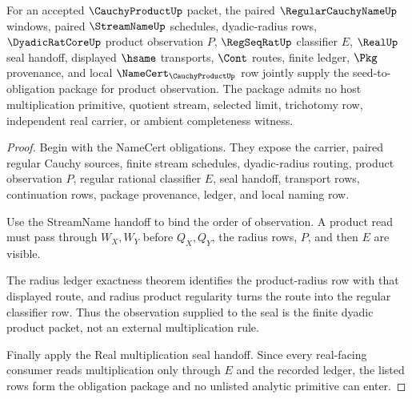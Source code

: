 \begin{theorem}
\label{thm:cauchy-product-product-observation-seal-obligations}
For an accepted $\CauchyProductUp$ packet, the paired $\RegularCauchyNameUp$ windows, paired $\StreamNameUp$ schedules, dyadic-radius rows, $\DyadicRatCoreUp$ product observation $P$, $\RegSeqRatUp$ classifier $E$, $\RealUp$ seal handoff, displayed $\hsame$ transports, $\Cont$ routes, finite ledger, $\Pkg$ provenance, and local $\NameCert_{\CauchyProductUp}$ row jointly supply the seed-to-obligation package for product observation. The package admits no host multiplication primitive, quotient stream, selected limit, trichotomy row, independent real carrier, or ambient completeness witness.
\end{theorem}
\begin{proof}
Begin with the NameCert obligations. They expose the carrier, paired regular Cauchy sources, finite stream schedules, dyadic-radius routing, product observation $P$, regular rational classifier $E$, seal handoff, transport rows, continuation rows, package provenance, ledger, and local naming row.

Use the StreamName handoff to bind the order of observation. A product read must pass through $W_X,W_Y$ before $Q_X,Q_Y$, the radius rows, $P$, and then $E$ are visible.

The radius ledger exactness theorem identifies the product-radius row with that displayed route, and radius product regularity turns the route into the regular classifier row. Thus the observation supplied to the seal is the finite dyadic product packet, not an external multiplication rule.

Finally apply the Real multiplication seal handoff. Since every real-facing consumer reads multiplication only through $E$ and the recorded ledger, the listed rows form the obligation package and no unlisted analytic primitive can enter.
\end{proof}

